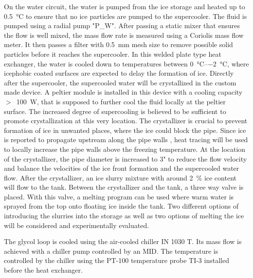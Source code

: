 \documentclass[english]{SFOEYearlyReportEnglish_2018}
\begin{document}
\noindent On the water circuit, the water is pumped from the ice storage and heated up to \SI{0.5}{\celsius} to ensure that no ice particles are pumped to the supercooler. The fluid is pumped using a radial pump "P\_W". After passing a static mixer that ensures the flow is well mixed, the mass flow rate is measured using a Coriolis mass flow meter. It then passes a filter with \SI{0.5}{mm} mesh size to remove possible solid particles before it reaches the supercooler. In this welded plate type heat exchanger, the water is cooled down to temperatures between \SIrange{0}{-2}{\celsius}, where icephobic coated surfaces are expected to delay the formation of ice. Directly after the supercooler, the supercooled water will be crystallized in the custom made device. A peltier module is installed in this device with a cooling capacity $>$~100~W, that is supposed to further cool the fluid locally at the peltier surface. The increased degree of supercooling is believed to be sufficient to promote crystallization at this very location. The crystallizer is crucial to prevent formation of ice in unwanted places, where the ice could block the pipe. Since ice is reported to propagate upstream along the pipe walls  \citep{mito_new_2002}, heat tracing will be used to locally increase the pipe walls above the freezing temperature. At the location of the crystallizer, the pipe diameter is increased to \si{3}{"} to reduce the flow velocity and balance the velocities of the ice front formation and the supercooled water flow. After the crystallizer, an ice slurry mixture with around \SI{2}{\%} ice content will flow to the tank. Between the crystallizer and the tank, a three way valve is placed. With this valve, a melting program can be used where warm water is sprayed from the top onto floating ice inside the tank. Two different options of introducing the slurries into the storage as  well as two options of melting the ice will be considered and experimentally evaluated.


The glycol loop is cooled using the air-cooled chiller IN 1030 T. Its mass flow is achieved with a chiller pump controlled by an MID. The temperature is controlled by the chiller using the PT-100 temperature probe TI-3 installed before the heat exchanger. 
\end{document}
